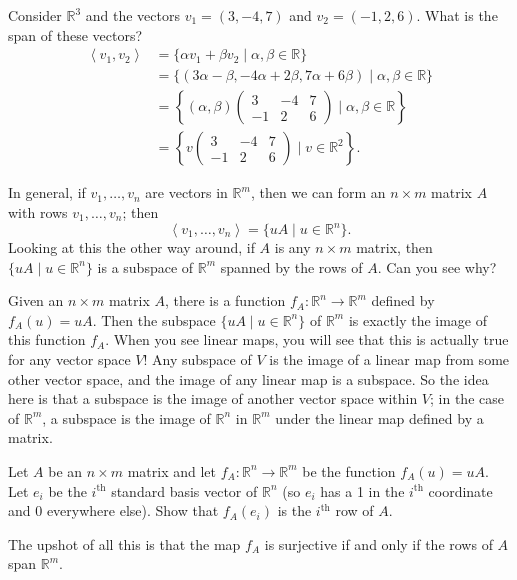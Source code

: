 \documentclass{article}
\newcommand{\SP}[1]{\left\langle #1 \right\rangle}
\begin{document}
Consider $\mathbb{R}^3$ and the vectors $v_1=(3,-4,7)$ and $v_2=(-1,2,6)$. What is the span of these vectors?
\begin{align*}
	\SP{v_1,v_2}&=\{\alpha v_1+\beta v_2\mid \alpha,\beta\in\mathbb{R}\}\\
	&=\{(3\alpha-\beta,-4\alpha + 2\beta,7\alpha+6\beta)\mid \alpha,\beta\in\mathbb{R}\}\\
	&=\left\{(\alpha, \beta)\left(\begin{array}{ccc} 3 & -4 & 7\\ -1 & 2 & 6\end{array}\right)\mid \alpha,\beta\in\mathbb{R}\right\}\\
	&=\left\{v\left(\begin{array}{ccc} 3 & -4 & 7\\ -1 & 2 & 6\end{array}\right)\mid v\in\mathbb{R}^2\right\}.
\end{align*}

In general, if $v_1,\hdots,v_n$ are vectors in $\mathbb{R}^m$, then we can form an $n\times m$ matrix $A$ with rows $v_1,\hdots,v_n$; then
\[\SP{v_1,\hdots,v_n}=\{uA\mid u\in\mathbb{R}^n\}.\]
Looking at this the other way around, if $A$ is any $n\times m$ matrix, then $\{uA\mid u\in\mathbb{R}^n\}$ is a subspace of $\mathbb{R}^m$ spanned by the rows of $A$. Can you see why?
\vfill



Given an $n\times m$ matrix $A$, there is a function $f_A:\mathbb{R}^n\to\mathbb{R}^m$ defined by $f_A(u)=uA$. Then the subspace $\{uA\mid u\in\mathbb{R}^n\}$ of $\mathbb{R}^m$ is exactly the image of this function $f_A$. When you see linear maps, you will see that this is actually true for any vector space $V$! Any subspace of $V$ is the image of a linear map from some other vector space, and the image of any linear map is a subspace. So the idea here is that a subspace is the image of another vector space within $V$; in the case of $\mathbb{R}^m$, a subspace is the image of $\mathbb{R}^n$ in $\mathbb{R}^m$ under the linear map defined by a matrix.\medskip

Let $A$ be an $n\times m$ matrix and let $f_A:\mathbb{R}^n\to\mathbb{R}^m$ be the function $f_A(u)=uA$. Let $e_i$ be the $i^\mathrm{th}$ standard basis vector of $\mathbb{R}^n$ (so $e_i$ has a 1 in the $i^\mathrm{th}$ coordinate and 0 everywhere else). Show that $f_A(e_i)$ is the $i^\mathrm{th}$ row of $A$.

\vfill

The upshot of all this is that the map $f_A$ is surjective if and only if the rows of $A$ span $\mathbb{R}^m$.
\end{document}
